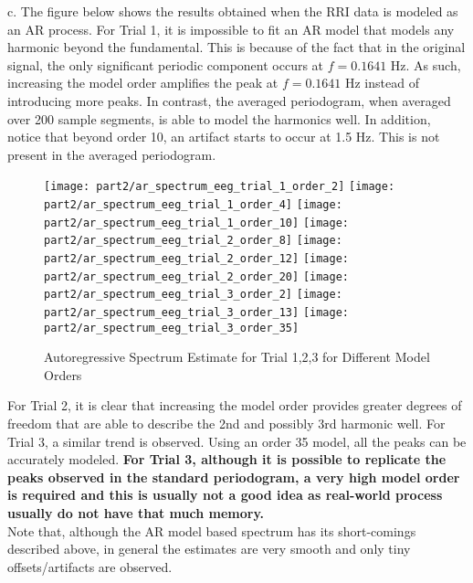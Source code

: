 \noindent{}c. The figure below shows the results obtained when the RRI data is modeled as an AR process. For Trial 1, it is impossible to fit an AR model that models any harmonic beyond the fundamental. This is because of the fact that in the original signal, the only significant periodic component occurs at $f=0.1641$ Hz. As such, increasing the model order amplifies the peak at $f=0.1641$ Hz instead of introducing more peaks. In contrast, the averaged periodogram, when averaged over 200 sample segments, is able to model the harmonics well. In addition, notice that beyond order 10, an artifact starts to occur at 1.5 Hz. This is not present in the averaged periodogram.

\begin{figure}[H]
\centering{}
\texttt{[image: part2/ar\_spectrum\_eeg\_trial\_1\_order\_2]}
\texttt{[image: part2/ar\_spectrum\_eeg\_trial\_1\_order\_4]}
\texttt{[image: part2/ar\_spectrum\_eeg\_trial\_1\_order\_10]}
\texttt{[image: part2/ar\_spectrum\_eeg\_trial\_2\_order\_8]}
\texttt{[image: part2/ar\_spectrum\_eeg\_trial\_2\_order\_12]}
\texttt{[image: part2/ar\_spectrum\_eeg\_trial\_2\_order\_20]}
\texttt{[image: part2/ar\_spectrum\_eeg\_trial\_3\_order\_2]}
\texttt{[image: part2/ar\_spectrum\_eeg\_trial\_3\_order\_13]}
\texttt{[image: part2/ar\_spectrum\_eeg\_trial\_3\_order\_35]}
\caption{Autoregressive Spectrum Estimate for Trial 1,2,3 for Different Model Orders}
\end{figure}

\noindent{}For Trial 2, it is clear that increasing the model order provides greater degrees of freedom that are able to describe the 2nd and possibly 3rd harmonic well. For Trial 3, a similar trend is observed. Using an order 35 model, all the peaks can be accurately modeled. \textbf{For Trial 3, although it is possible to replicate the peaks observed in the standard periodogram, a very high model order is required and this is usually not a good idea as real-world process usually do not have that much memory.}\\

\noindent{}Note that, although the AR model based spectrum has its short-comings described above, in general the estimates are very smooth and only tiny offsets/artifacts are observed.

